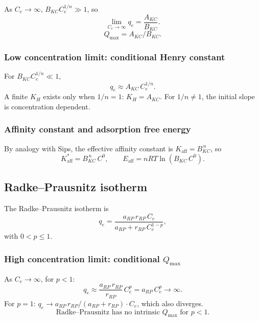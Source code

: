 \documentclass[journal=aamick,manuscript=article]{achemso}
\begin{document}
As $C_e \to \infty$, $B_{KC}C_e^{1/n} \gg 1$, so
\begin{equation}
	\lim_{C_e \to \infty} q_e = \frac{A_{KC}}{B_{KC}}.
\end{equation}
\begin{equation}
	\boxed{Q_{\max} = A_{KC}/B_{KC}.}
\end{equation}

\subsubsection{Low concentration limit: conditional Henry constant}

For $B_{KC}C_e^{1/n} \ll 1$,
\begin{equation}
	q_e \approx A_{KC}\, C_e^{1/n}.
\end{equation}
A finite $K_H$ exists only when $1/n = 1$: $K_H = A_{KC}$.
For $1/n \neq 1$, the initial slope is concentration dependent.

\subsubsection{Affinity constant and adsorption free energy}

By analogy with Sips, the effective affinity constant is
$K_{\mathrm{aff}} = B_{KC}^{\,n}$, so
\begin{equation}
	\boxed{
		K_{\mathrm{aff}}^{\ast} = B_{KC}^{\,n}\, C^0,
		\qquad
		E_{\mathrm{aff}} = nRT\ln(B_{KC}\, C^0).
	}
\end{equation}

\subsection{Radke--Prausnitz isotherm}
\label{sec:si_radke_prausnitz}

The Radke--Prausnitz isotherm is
\begin{equation}
	q_e = \frac{a_{RP}\, r_{RP}\, C_e}{a_{RP} + r_{RP}\, C_e^{1-p}},
	\label{eq:si_radke_prausnitz}
\end{equation}
with $0 < p \leq 1$.

\subsubsection{High concentration limit: conditional $Q_{\max}$}

As $C_e \to \infty$, for $p < 1$:
\begin{equation}
	q_e \approx \frac{a_{RP}\, r_{RP}}{r_{RP}}\, C_e^{p} = a_{RP}\, C_e^{p} \to \infty.
\end{equation}
For $p = 1$: $q_e \to a_{RP}\, r_{RP}/(a_{RP} + r_{RP}) \cdot C_e$, which also diverges.
\begin{equation}
	\boxed{\text{Radke--Prausnitz has no intrinsic } Q_{\max} \text{ for } p < 1.}
\end{equation}
\end{document}
